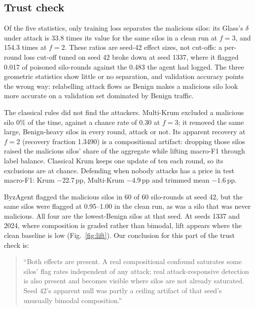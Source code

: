 \documentclass[conference]{IEEEtran}
\begin{document}
\subsection{Trust check}
\label{sec:r-trust}
Of the five statistics, only training loss separates the malicious silos: its Glass's
$\delta$ under attack is 33.8 times its value for the same silos in a clean run at $f=3$, %
and 154.3 times at $f=2$. These ratios are seed-42 effect sizes, not cut-offs: a %
per-round loss cut-off tuned on seed 42 broke down at seed 1337, where it flagged 0.017 %
of poisoned silo-rounds against the 0.483 the agent had logged. The three geometric %
statistics show little or no separation, and validation accuracy points the wrong way:
relabelling attack flows as Benign makes a malicious silo look more accurate on a
validation set dominated by Benign traffic.

The classical rules did not find the attackers. Multi-Krum excluded a malicious silo
0\% of the time, against a chance rate of 0.30 at $f=3$; it removed the same large, %
Benign-heavy silos in every round, attack or not. Its apparent recovery at $f=2$ %
(recovery fraction 1.3490) is a compositional artifact: dropping those silos raised the %
malicious silos' share of the aggregate while lifting macro-F1 through label balance.
Classical Krum keeps one update of ten each round, so its exclusions are at chance.
Defending when nobody attacks has a price in test macro-F1: Krum $-22.7$\,pp, %
Multi-Krum $-4.9$\,pp and trimmed mean $-1.6$\,pp. %

ByzAgent flagged the malicious silos in 60 of 60 silo-rounds at seed 42, but the same %
silos were flagged at 0.95--1.00 in the clean run, as was a silo that was never %
malicious. All four are the lowest-Benign silos at that seed. At seeds 1337 and 2024, %
where composition is graded rather than bimodal, lift appears where the clean baseline
is low (Fig.~\ref{fig:lift}). Our conclusion for this part of the trust check is:
\begin{quote}\small
``Both effects are present. A real compositional confound saturates some silos' flag
rates independent of any attack; real attack-responsive detection is also present and
becomes visible where silos are not already saturated. Seed 42's apparent null was %
partly a ceiling artifact of that seed's unusually bimodal composition.''
\end{quote}
\end{document}
